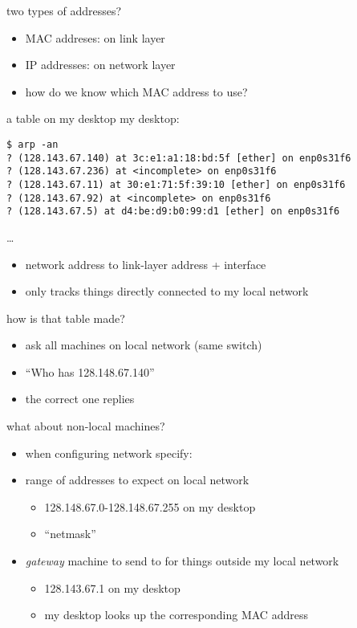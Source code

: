 \begin{frame}{two types of addresses?}
    \begin{itemize}
    \item MAC addreses: on link layer
    \item IP addresses: on network layer
    \vspace{.5cm}
    \item how do we know which MAC address to use?
    \end{itemize}
\end{frame}

\begin{frame}[fragile]{a table on my desktop}
my desktop: \\
\begin{Verbatim}[fontsize=\fontsize{11}{12}\selectfont]
$ arp -an
? (128.143.67.140) at 3c:e1:a1:18:bd:5f [ether] on enp0s31f6
? (128.143.67.236) at <incomplete> on enp0s31f6
? (128.143.67.11) at 30:e1:71:5f:39:10 [ether] on enp0s31f6
? (128.143.67.92) at <incomplete> on enp0s31f6
? (128.143.67.5) at d4:be:d9:b0:99:d1 [ether] on enp0s31f6
\end{Verbatim}
\ldots
\begin{itemize}
    \item network address to link-layer address + interface
    \item only tracks things directly connected to my local network
\end{itemize}
\end{frame}

\begin{frame}{how is that table made?}
    \begin{itemize}
    \item ask all machines on local network (same switch)
    \item ``Who has 128.148.67.140''
    \item the correct one replies
    \end{itemize}
\end{frame}

\begin{frame}{what about non-local machines?}
    \begin{itemize}
    \item when configuring network specify:
    \vspace{.5cm}
    \item range of addresses to expect on local network 
        \begin{itemize}
        \item 128.148.67.0-128.148.67.255 on my desktop
        \item ``netmask''
        \end{itemize}
    \item \textit{gateway} machine to send to for things outside my local network
        \begin{itemize}
        \item 128.143.67.1 on my desktop
        \item my desktop looks up the corresponding MAC address
        \end{itemize}
    \end{itemize}
\end{frame}

